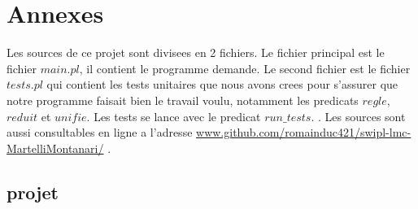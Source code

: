 \documentclass[10pt,a4paper]{report}
\begin{document}
\section{Annexes}

Les sources de ce projet sont divisees en 2 fichiers. Le fichier principal est le fichier $main.pl$, il contient le programme demande. Le second fichier est le fichier $tests.pl$ qui contient les tests unitaires que nous avons crees pour s'assurer que notre programme faisait bien le travail voulu, notamment les predicats $regle$, $reduit$ et $unifie$. Les tests se lance avec le predicat $run\_tests. $ . Les sources sont aussi consultables en ligne a l'adresse \url{www.github.com/romainduc421/swipl-lmc-MartelliMontanari/} .

\subsection{projet}
\end{document}
